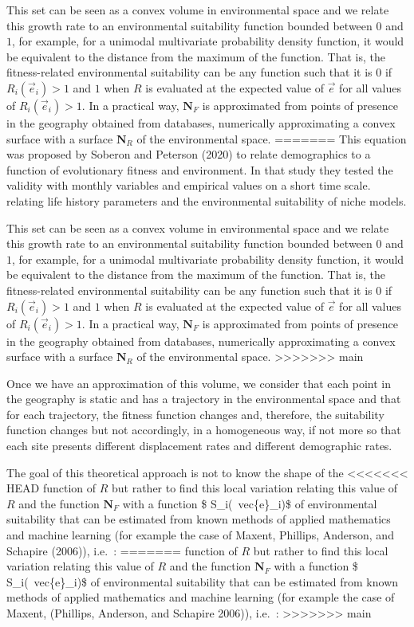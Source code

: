 \documentclass[
]{article}
\begin{document}
This set can be seen as a convex volume in environmental space and we
relate this growth rate to an environmental suitability function bounded
between \(0\) and \(1\), for example, for a unimodal multivariate probability density function,
it would be equivalent to the distance from the maximum of the function.
That is, the fitness-related environmental suitability can be any
function such that it is \(0\) if \(R_i(\vec{e}_i) > 1\) and \(1\) when
\(R\) is evaluated at the expected value of \(\vec {e}\) for all values
of \(R_i(\vec{e}_i) > 1\). In a practical way, \(\mathbf{N}_F\) is
approximated from points of presence in the geography obtained from
databases, numerically approximating a convex surface with a surface
\(\mathbf{N}_R\) of the environmental space.
=======
This equation was proposed by Soberon and Peterson (2020) to relate
demographics to a function of evolutionary fitness and environment. In
that study they tested the validity with monthly variables and empirical
values on a short time scale. relating life history parameters and the
environmental suitability of niche models.

This set can be seen as a convex volume in environmental space and we
relate this growth rate to an environmental suitability function bounded
between \(0\) and \(1\), for example, for a unimodal multivariate
probability density function, it would be equivalent to the distance
from the maximum of the function. That is, the fitness-related
environmental suitability can be any function such that it is \(0\) if
\(R_i(\vec{e}_i) > 1\) and \(1\) when \(R\) is evaluated at the expected
value of \(\vec {e}\) for all values of \(R_i(\vec{e}_i) > 1\). In a
practical way, \(\mathbf{N}_F\) is approximated from points of presence
in the geography obtained from databases, numerically approximating a
convex surface with a surface \(\mathbf{N}_R\) of the environmental
space.
>>>>>>> main

Once we have an approximation of this volume, we consider that each
point in the geography is static and has a trajectory in the
environmental space and that for each trajectory, the fitness function
changes and, therefore, the suitability function changes but not
accordingly, in a homogeneous way, if not more so that each site
presents different displacement rates and different demographic rates.

The goal of this theoretical approach is not to know the shape of the
<<<<<<< HEAD
function of \(R\) but rather to find this local variation relating
this value of \(R\) and the function \(\mathbf{N}_F\) with a function
\$ S\_i(~vec\{e\}\_i)\$ of environmental suitability that can be
estimated from known methods of applied mathematics and machine learning
(for example the case of Maxent, Phillips, Anderson, and Schapire
(2006)), i.e.~:
=======
function of \(R\) but rather to find this local variation relating this
value of \(R\) and the function \(\mathbf{N}_F\) with a function \$
S\_i(~vec\{e\}\_i)\$ of environmental suitability that can be estimated
from known methods of applied mathematics and machine learning (for
example the case of Maxent, (Phillips, Anderson, and Schapire 2006)),
i.e.~:
>>>>>>> main
\end{document}
